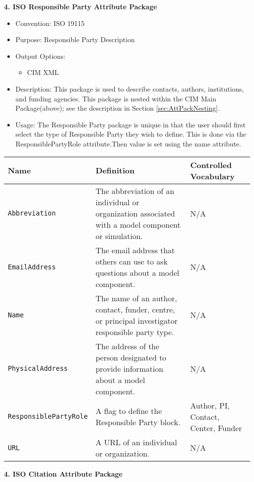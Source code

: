 \vspace{.20in}
{\bf 4. ISO Responsible Party Attribute Package}

\begin{itemize}
    \item Convention: ISO 19115
    \item Purpose: Responsible Party Description
    \item Output Options: 
    \begin{itemize}
        \item CIM XML 
    \end{itemize} 
    \item Description: This package is used to describe contacts, authors, institutions, and funding agencies. This package is nested within the CIM Main Package(above); see the description in Section \ref{sec:AttPackNesting}.
    \item Usage: The Responsible Party package is unique in that the user should first select the type of Responsible Party they wish to define. This is done via the ResponsiblePartyRole attribute.Then value is set using the name attribute.  
\end{itemize}


\begin{tabular}{|p{5cm}|p{7cm}|p{5cm}|}
     {\bf Name } & {\bf Definition} & {\bf Controlled Vocabulary} \\
     \hline\hline
     {\tt Abbreviation} & The abbreviation of an individual or organization associated with a model component or simulation. & N/A \\
     {\tt EmailAddress} & The email address that others can use to ask questions about a model component. & N/A \\
     {\tt Name} & The name of an author, contact, funder, centre, or principal investigator responsible party type. & N/A \\
     {\tt PhysicalAddress} & The address of the person designated to provide information about a model component. & N/A \\
     {\tt ResponsiblePartyRole} & A flag to define the Responsible Party block. & Author, PI, Contact, Center, Funder\\
     {\tt URL} & A URL of an individual or organization. & N/A \\
\end{tabular}


\vspace{.20in}
{\bf 4. ISO Citation Attribute Package}

